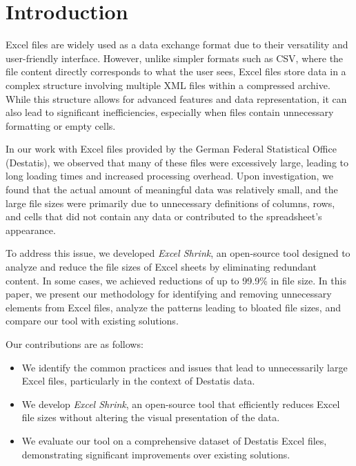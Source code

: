 \documentclass[sigconf]{acmart}
\begin{document}
\maketitle

\section{Introduction}

Excel files are widely used as a data exchange format due to their versatility and user-friendly interface. However, unlike simpler formats such as CSV, where the file content directly corresponds to what the user sees, Excel files store data in a complex structure involving multiple XML files within a compressed archive. While this structure allows for advanced features and data representation, it can also lead to significant inefficiencies, especially when files contain unnecessary formatting or empty cells.

In our work with Excel files provided by the German Federal Statistical Office (Destatis), we observed that many of these files were excessively large, leading to long loading times and increased processing overhead. Upon investigation, we found that the actual amount of meaningful data was relatively small, and the large file sizes were primarily due to unnecessary definitions of columns, rows, and cells that did not contain any data or contributed to the spreadsheet's appearance.

To address this issue, we developed \textit{Excel Shrink}, an open-source tool designed to analyze and reduce the file sizes of Excel sheets by eliminating redundant content. In some cases, we achieved reductions of up to 99.9\% in file size. In this paper, we present our methodology for identifying and removing unnecessary elements from Excel files, analyze the patterns leading to bloated file sizes, and compare our tool with existing solutions.

Our contributions are as follows:

\begin{itemize}
    \item We identify the common practices and issues that lead to unnecessarily large Excel files, particularly in the context of Destatis data.
    \item We develop \textit{Excel Shrink}, an open-source tool that efficiently reduces Excel file sizes without altering the visual presentation of the data.
    \item We evaluate our tool on a comprehensive dataset of Destatis Excel files, demonstrating significant improvements over existing solutions.
\end{itemize}
\end{document}
